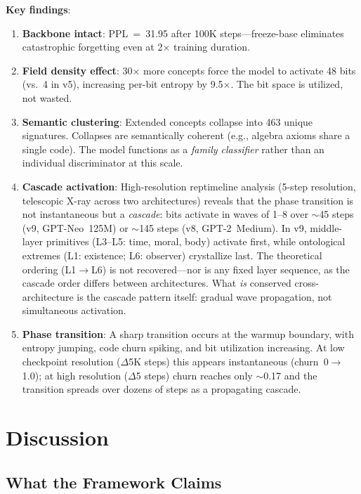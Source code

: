 \documentclass[11pt, a4paper]{article}
\begin{document}
\noindent\textbf{Key findings}:

\begin{enumerate}[nosep, leftmargin=*]
    \item \textbf{Backbone intact}: PPL~=~31.95 after 100K steps---freeze-base eliminates catastrophic forgetting even at 2$\times$ training duration.
    \item \textbf{Field density effect}: 30$\times$ more concepts force the model to activate 48 bits (vs.\ 4 in v5), increasing per-bit entropy by 9.5$\times$. The bit space is utilized, not wasted.
    \item \textbf{Semantic clustering}: Extended concepts collapse into 463 unique signatures. Collapses are semantically coherent (e.g., algebra axioms share a single code). The model functions as a \emph{family classifier} rather than an individual discriminator at this scale.
    \item \textbf{Cascade activation}: High-resolution reptimeline analysis (5-step resolution, telescopic X-ray across two architectures) reveals that the phase transition is not instantaneous but a \emph{cascade}: bits activate in waves of 1--8 over $\sim$45 steps (v9, GPT-Neo~125M) or $\sim$145 steps (v8, GPT-2~Medium). In v9, middle-layer primitives (L3--L5: time, moral, body) activate first, while ontological extremes (L1: existence; L6: observer) crystallize last. The theoretical ordering (L1$\to$L6) is not recovered---nor is any fixed layer sequence, as the cascade order differs between architectures. What \emph{is} conserved cross-architecture is the cascade pattern itself: gradual wave propagation, not simultaneous activation.
    \item \textbf{Phase transition}: A sharp transition occurs at the warmup boundary, with entropy jumping, code churn spiking, and bit utilization increasing. At low checkpoint resolution ($\Delta$5K steps) this appears instantaneous (churn~0$\to$1.0); at high resolution ($\Delta$5 steps) churn reaches only $\sim$0.17 and the transition spreads over dozens of steps as a propagating cascade.
\end{enumerate}

\section{Discussion}

\subsection{What the Framework Claims}
\end{document}
